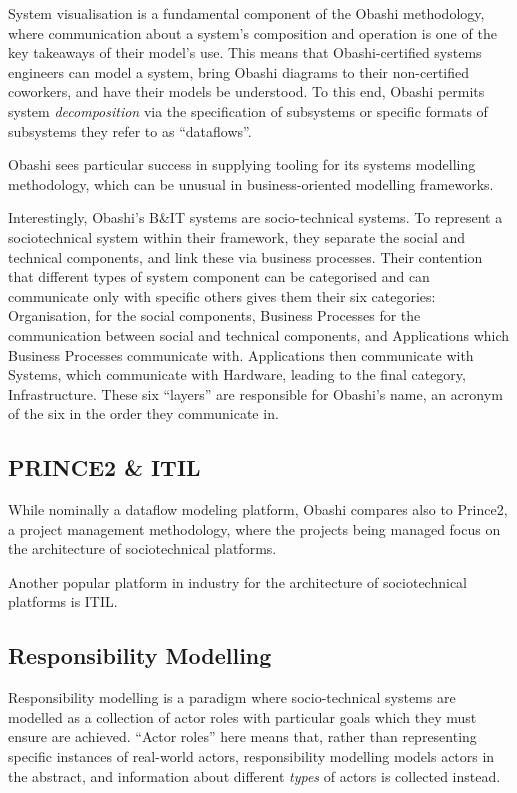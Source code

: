 \documentclass[draft,12pt]{article}
\begin{document}
System visualisation is a fundamental component of the Obashi methodology, where
communication about a system's composition and operation is one of the key
takeaways of their model's use. This means that Obashi-certified systems
engineers can model a system, bring Obashi diagrams to their non-certified
coworkers, and have their models be understood. To this end, Obashi permits
system \emph{decomposition} via the specification of subsystems or specific
formats of subsystems they refer to as ``dataflows''.
\par

Obashi sees particular success in supplying tooling for its systems
modelling methodology, which can be unusual in business-oriented modelling
frameworks.
\par

Interestingly, Obashi's B\&IT systems are socio-technical systems. To represent
a sociotechnical system within their framework, they separate the social and
technical components, and link these via business processes. Their contention
that different types of system component can be categorised and can communicate
only with specific others gives them their six categories: Organisation, for the
social components, Business Processes for the communication between social and
technical components, and Applications which Business Processes communicate
with. Applications then communicate with Systems, which communicate with
Hardware, leading to the final category, Infrastructure. These six ``layers''
are responsible for Obashi's name, an acronym of the six in the order they
communicate in.
\par

\subsection{PRINCE2 \& ITIL}
While nominally a dataflow modeling platform, Obashi compares also to Prince2,
a project management methodology, where the projects being managed focus on the
architecture of sociotechnical platforms.


Another popular platform in industry for the architecture of sociotechnical
platforms is ITIL.


\subsection{Responsibility Modelling}
Responsibility modelling is a paradigm where socio-technical systems are
modelled as a collection of actor roles with particular goals which they must
ensure are achieved. ``Actor roles'' here means that, rather than representing
specific instances of real-world actors, responsibility modelling models actors
in the abstract, and information about different \emph{types} of actors is
collected instead.
\par
\end{document}
